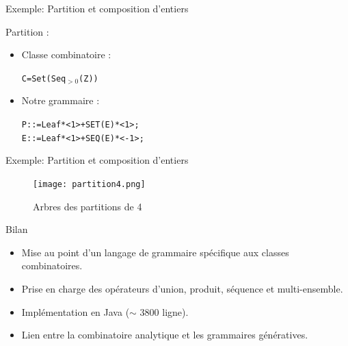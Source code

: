 \documentclass{beamer}
\begin{document}
\begin{frame}{Exemple: Partition et composition d'entiers}

\begin{block}{Partition :}
\begin{itemize}
\item Classe combinatoire :\\
\begin{alltt}
\hspace{10 mm} C = Set(Seq$_{>0}$(Z)) \\
\end{alltt}
\item Notre grammaire : \\
\begin{alltt}
\hspace{10 mm} P ::= Leaf * <1> + SET(E) * <1>; \\
\hspace{10 mm} E ::= Leaf * <1> + SEQ(E) * <-1>; \\
\end{alltt}
\end{itemize}
\end{block}
\end{frame}


\begin{frame}{Exemple: Partition et composition d'entiers}
\begin{figure}[h]
  \centering
  \texttt{[image: partition4.png]}
  \caption{Arbres des partitions de 4}
\end{figure}
\end{frame}

\begin{frame}{Bilan}
\begin{itemize}
\item Mise au point d'un langage de grammaire spécifique aux classes combinatoires.
\item Prise en charge des opérateurs d'union, produit, séquence et multi-ensemble.
\item Implémentation en Java ($\sim$ 3800 ligne). \\
  \footnotesize{}
\normalsize
\item Lien entre la combinatoire analytique et les grammaires génératives.
\end{itemize}
\end{frame}
\end{document}
